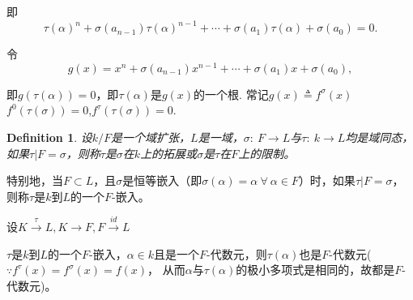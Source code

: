\documentclass[UTF8]{article}
\newtheorem{defn}{Definition}[section]
\begin{document}
即$$\tau\left( \alpha\right)^n+\sigma\left( a_{n-1}\right)\tau\left( \alpha\right)^{n-1}+\cdots+\sigma\left( a_1\right)\tau\left( \alpha\right)+\sigma\left( a_0\right)=0.$$

令$$g(x)=x^{n}+\sigma\left(a_{n-1}\right) x^{n-1}+\cdots+\sigma\left(a_{1}\right) x+\sigma\left(a_{0}\right),$$

即$g\left( \tau\left( \alpha\right)\right)=0$，即$\tau\left( \alpha\right)$是$g\left( x\right)$的一个根.
常记$g(x) \triangleq f^{\sigma}(x)$
$f^{0}(\tau(\sigma)) = 0$,$f^{\tau}(\tau(\sigma)) = 0.$

\begin{defn}设$k/F$是一个域扩张，$L$是一域，$\sigma:\ F\longrightarrow L$与$\tau:\ k\longrightarrow L$均是域同态，如果$\tau|F=\sigma$，则称$\tau$是$\sigma$在$k$上的拓展或$\sigma$是$\tau$在$F$上的限制。
\end{defn}
特别地，当$F\subset L$，且$\sigma$是恒等嵌入（即$\sigma(\alpha)=\alpha\ \forall\ \alpha\in F$）时，如果$\tau|F=\sigma$，则称$\tau$是$k$到$L$的一个$F$-嵌入。

设$K\xrightarrow{\tau}L,K\longrightarrow F,F\xrightarrow{id}L$

$\tau$是$k$到$L$的一个$F$-嵌入，$\alpha\in k$且是一个$F$-代数元，则$\tau(\alpha)$也是$F$-代数元($\because f^\tau(x)=f^{\sigma}(x)=f(x)$，
从而$\alpha$与$\tau(\alpha)$的极小多项式是相同的，故都是$F$-代数元)。\\
\end{document}
